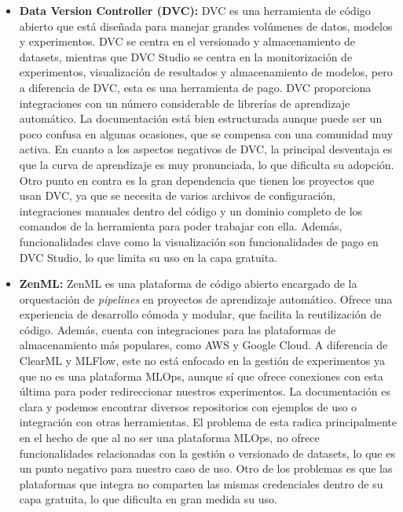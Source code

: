 \begin{itemize}
    \item \textbf{Data Version Controller (DVC):} DVC \cite{dvc} es una herramienta de código abierto que
    está diseñada para manejar grandes volúmenes de datos, modelos y experimentos. DVC
    se centra en el versionado y almacenamiento de datasets, mientras que DVC Studio se centra en la
    monitorización de experimentos, visualización de resultados y almacenamiento de modelos, pero a diferencia
    de DVC, esta es una herramienta de pago. DVC proporciona integraciones con un número considerable de librerías de 
    aprendizaje automático. La documentación está bien estructurada aunque puede ser un poco confusa en algunas ocasiones, 
    que se compensa con una comunidad muy activa. En cuanto a los aspectos negativos de DVC, la principal desventaja es que
    la curva de aprendizaje es muy pronunciada, lo que dificulta su adopción. Otro punto en contra
    es la gran dependencia que tienen los proyectos que usan DVC, ya que se necesita de varios archivos
    de configuración, integraciones manuales dentro del código y un dominio completo de los comandos de la
    herramienta para poder trabajar con ella. Además, funcionalidades clave como la visualización son funcionalidades
    de pago en DVC Studio, lo que limita su uso en la capa gratuita.
    
    \item \textbf{ZenML:} ZenML \cite{Zenml} es una plataforma de código abierto encargado de la orquestación de \textit{pipelines} en
    proyectos de aprendizaje automático. Ofrece una experiencia de desarrollo cómoda y modular, que facilita
    la reutilización de código. Además, cuenta con integraciones para las plataformas de almacenamiento
    más populares, como AWS y Google Cloud. A diferencia de ClearML y MLFlow, este no está enfocado en la
    gestión de experimentos ya que no es una plataforma MLOps, aunque sí que ofrece conexiones con esta última
    para poder redireccionar nuestros experimentos. La documentación es clara y podemos encontrar diversos repositorios 
    con ejemplos de uso o integración con otras herramientas. El problema de esta radica principalmente
    en el hecho de que al no ser una plataforma MLOps, no ofrece funcionalidades relacionadas con la gestión
    o versionado de datasets, lo que es un punto negativo para nuestro caso de uso. Otro de los problemas
    es que las plataformas que integra no comparten las mismas credenciales dentro de su capa
    gratuita, lo que dificulta en gran medida su uso. 


\end{itemize}
